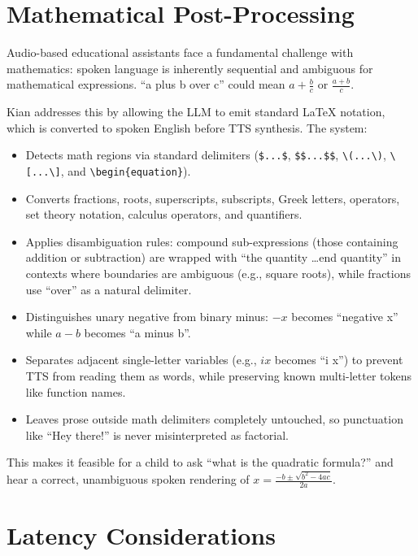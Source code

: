 \documentclass[11pt]{article}
\begin{document}
\section{Mathematical Post-Processing}

Audio-based educational assistants face a fundamental challenge with mathematics:
spoken language is inherently sequential and ambiguous for mathematical expressions.
``a plus b over c'' could mean $a + \frac{b}{c}$ or $\frac{a+b}{c}$.

Kian addresses this by allowing the LLM to emit standard LaTeX notation,
which is converted to spoken English before TTS synthesis.
The system:

\begin{itemize}[nosep]
  \item Detects math regions via standard delimiters (\texttt{\$...\$}, \texttt{\$\$...\$\$}, \verb|\(...\)|, \verb|\[...\]|, and \verb|\begin{equation}|).
  \item Converts fractions, roots, superscripts, subscripts, Greek letters, operators, set theory notation, calculus operators, and quantifiers.
  \item Applies disambiguation rules:
    compound sub-expressions (those containing addition or subtraction) are wrapped with ``the quantity \ldots end quantity'' in contexts where boundaries are ambiguous (e.g., square roots),
    while fractions use ``over'' as a natural delimiter.
  \item Distinguishes unary negative from binary minus:
    $-x$ becomes ``negative x'' while $a - b$ becomes ``a minus b''.
  \item Separates adjacent single-letter variables (e.g., $ix$ becomes ``i x'') to prevent TTS from reading them as words,
    while preserving known multi-letter tokens like function names.
  \item Leaves prose outside math delimiters completely untouched,
    so punctuation like ``Hey there!'' is never misinterpreted as factorial.
\end{itemize}

\noindent This makes it feasible for a child to ask ``what is the quadratic formula?''
and hear a correct, unambiguous spoken rendering of $x = \frac{-b \pm \sqrt{b^2 - 4ac}}{2a}$.

\section{Latency Considerations}
\label{sec:latency}
\end{document}

